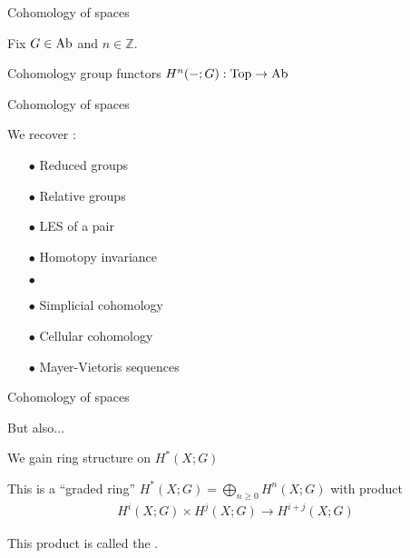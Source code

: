 \begin{frame}[t]{Cohomology of spaces} %

  \par Fix $G \in \mathrm{Ab}$ and $n \in \mathbb{Z}$.
  \par{} Cohomology group functors $H^n ({-} ; G) : \mathrm{Top} \to \mathrm{Ab}$
  
\end{frame}

\begin{frame}{Cohomology of spaces} %

  \par We recover \cite[\ppno~199-204]{hatcher}:
  \begin{itemize}
    \item[$\bullet$] Reduced groups
    \item[$\bullet$] Relative groups
    \item[$\bullet$] LES of a pair
    \item[$\bullet$] Homotopy invariance
    \item[$\bullet$] 
    \item[$\bullet$] Simplicial cohomology
    \item[$\bullet$] Cellular cohomology
    \item[$\bullet$] Mayer-Vietoris sequences
  \end{itemize}
  
\end{frame}

\begin{frame}{Cohomology of spaces} %

  \par But also$\dots$

  \pause
  \begin{block}{}
    \centering
    We gain ring structure on $H^{*} (X ; G)$
  \end{block}

  \pause
  \par This is a ``graded ring'' $H^{*} (X ; G) = \bigoplus_{n \geq 0} H^n (X ; G)$ with product
  \begin{align*}
    H^i (X ; G) \times H^j (X ; G) \to H^{i + j} (X ; G)
  \end{align*}
  \par This product is called the  \cite[\pno~206]{hatcher}.
  
\end{frame}
